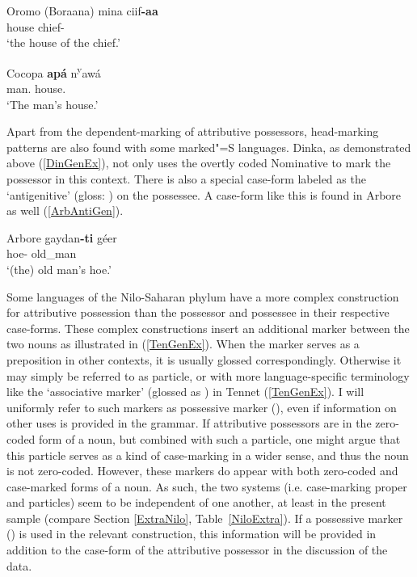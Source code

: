 \begin{exe}\ex\label{BorGenEx} {Oromo (Boraana)} \citep[Eastern Cushitic; Ethiopia; ][35]{Stroomer:1995}\nopagebreak[4]
\gll mina ciif\textbf{-aa}\\
house chief-\gen{}\\
`the house of the chief.'
\end{exe} 

\begin{exe}\ex\label{CocGenEx} {Cocopa} \citep[Yuman; California; ][165]{Crawford:1966}\nopagebreak[4]
\gll\textbf{ ap\'a} n\textsuperscript{y}aw\'a\\
man.\acc{} house.\acc{}\\
`The man's house.'
\end{exe}


Apart from the dependent-marking of attributive possessors, head-marking patterns are also found with some marked"=S languages.
Dinka, as demonstrated above (\ref{DinGenEx}), not only uses the overtly coded Nominative  to mark the possessor in this context. 
There is also a special case-form labeled as the `antigenitive' (gloss: \antgen{}) on the possessee. 
A case-form like this is found in Arbore as well (\ref{ArbAntiGen}).


\begin{exe}\ex\label{ArbAntiGen} {Arbore} \citep[Eastern Cushitic; Ethiopia; ][151]{Hayward:1984}\nopagebreak[4]
\gll gaydan\textbf{-ti} g\'eer\\
 hoe-\antgen{} old\_man\\
 `(the) old man's hoe.'
 \end{exe} 
 
Some languages of the Nilo-Saharan phylum have a more complex construction for attributive possession than the possessor and possessee in their respective case-forms.
These complex constructions insert an additional marker between the two nouns as illustrated in (\ref{TenGenEx}). 
When the marker serves as a preposition in other contexts, it is usually glossed correspondingly. 
Otherwise it may simply be referred to as particle, or with more language-specific terminology like the `associative marker' (glossed as \am{}) in Tennet (\ref{TenGenEx}).
I will uniformly refer to such markers as possessive marker (\poss{}), even if information on other uses is provided in the grammar.
If attributive possessors are in the zero-coded form of a noun, but combined with such a particle, one might argue that this particle serves as a kind of case-marking in a wider sense, and thus the noun is not zero-coded.
However, these markers do appear with both zero-coded and case-marked forms of a noun.
As such, the two systems (i.e. case-marking proper and particles) seem to be independent of one another, at least in the present sample (compare Section \ref{ExtraNilo}, Table~\ref{NiloExtra}). 
If a possessive marker (\poss{}) is used in the relevant construction, this information will be provided in addition to the case-form of the attributive possessor in the discussion of the data.

